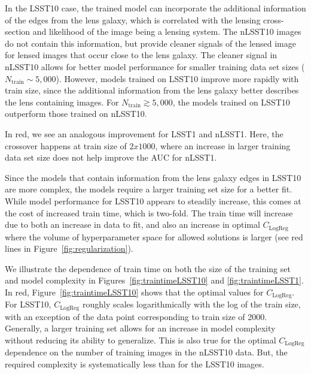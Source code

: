 \documentclass{emulateapj}
\def\gsim{\gtrsim}
\begin{document}
In the LSST10 case, the trained model can incorporate the additional
information of the edges from the lens galaxy, which is correlated
with the lensing cross-section and likelihood of the image being a
lensing system.  The nLSST10 images do not contain this information,
but provide cleaner signals of the lensed image for lensed images that
occur close to the lens galaxy.  The cleaner signal in nLSST10 allows
for better model performance for smaller training data set sizes
($N_\text{train}\sim5,000$).  However, models trained on LSST10
improve more rapidly with train size, since the additional information
from the lens galaxy better describes the lens containing images.  For
$N_\text{train}\gsim 5,000$, the models trained on LSST10 outperform
those trained on nLSST10.

In red, we see an analogous improvement for LSST1 and nLSST1.  Here,
the crossover happens at train size of $2x1000$, where an increase in
larger training data set size does not help improve the AUC for nLSST1.

Since the models that contain information from the lens galaxy edges
in LSST10 are more complex, the models require a larger training set
size for a better fit.  While model performance for LSST10 appears to
steadily increase, this comes at the cost of increased train time,
which is two-fold.  The train time will increase due to both an
increase in data to fit, and also an increase in optimal
$C_\text{LogReg}$ where the volume of hyperparameter space for allowed
solutions is larger (see red lines in
Figure~\ref{fig:regularization}).  

We illustrate the dependence of train time on both the size of the
training set and model complexity in Figures~\ref{fig:traintimeLSST10}
and \ref{fig:traintimeLSST1}.  In red,
Figure~\ref{fig:traintimeLSST10} shows that the optimal values for
$C_\text{LogReg}$.  For LSST10, $C_\text{LogReg}$ roughly scales
logarithmically with the log of the train size, with an exception of
the data point corresponding to train size of 2000.  Generally, a
larger training set allows for an increase in model complexity without
reducing its ability to generalize.  This is also true for the optimal
$C_\text{LogReg}$ dependence on the number of training images in the
nLSST10 data.  But, the required complexity is systematically less
than for the LSST10 images.
\end{document}
